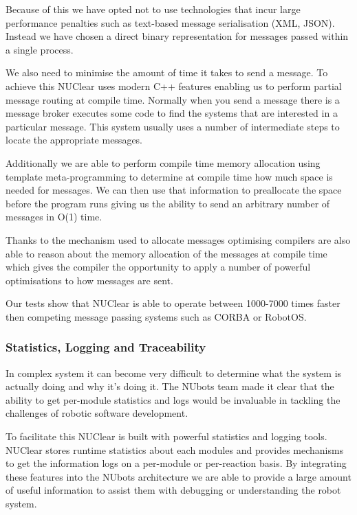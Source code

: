 \documentclass[english,12pt]{scrartcl}
\begin{document}
				Because of this we have opted not to use technologies that incur large performance penalties such as text-based message serialisation (XML, JSON).
				Instead we have chosen a direct binary representation for messages passed within a single process. 
				
				We also need to minimise the amount of time it takes to send a message. 
				To achieve this NUClear uses modern C++ features enabling us to perform partial message routing at compile time.
				Normally when you send a message there is a message broker executes some code to find the systems that are interested in a particular message.
				This system usually uses a number of intermediate steps to locate the appropriate messages.
				
				Additionally we are able to perform compile time memory allocation using template meta-programming to determine at compile time how much space is needed for messages.
				We can then use that information to preallocate the space before the program runs giving us the ability to send an arbitrary number of messages in O(1) time.
			
				Thanks to the mechanism used to allocate messages optimising compilers are also able to reason about the memory allocation of the messages at compile time which gives the compiler the opportunity to apply a number of powerful optimisations to how messages are sent.
				
				Our tests show that NUClear is able to operate between 1000-7000 times faster then competing message passing systems such as CORBA or RobotOS.
				
			\subsubsection{Statistics, Logging and Traceability}
				In complex system it can become very difficult to determine what the system is actually doing and why it's doing it. 
				The NUbots team made it clear that the ability to get per-module statistics and logs would be invaluable in tackling the challenges of robotic software development.
				
				To facilitate this NUClear is built with powerful statistics and logging tools.
				NUClear stores runtime statistics about each modules and provides mechanisms to get the information logs on a per-module or per-reaction basis. 
				By integrating these features into the NUbots architecture we are able to provide a large amount of useful information to assist them with debugging or understanding the robot system. 
				
\end{document}
